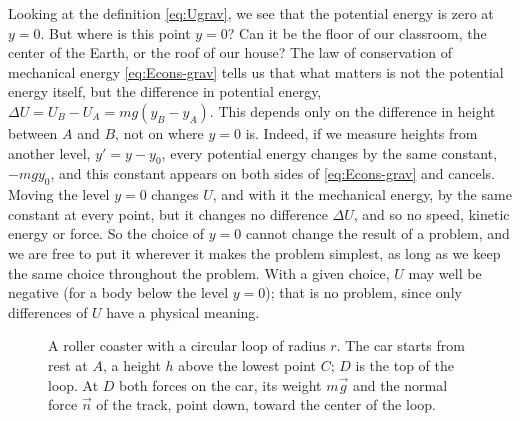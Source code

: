 \documentclass[11pt,a4paper]{article}
\begin{document}
Looking at the definition \eqref{eq:Ugrav}, we see that the potential energy is zero at $y = 0$.
But where is this point $y = 0$? Can it be the floor of our classroom, the center of the Earth, or
the roof of our house? The law of conservation of mechanical energy \eqref{eq:Econs-grav} tells us
that what matters is not the potential energy itself, but the difference in potential energy,
$\Delta U = U_B - U_A = mg(y_B - y_A)$. This depends only on the difference in height between $A$
and $B$, not on where $y = 0$ is. Indeed, if we measure heights from another level, $y' = y - y_0$,
every potential energy changes by the same constant, $-mgy_0$, and this constant appears on both
sides of \eqref{eq:Econs-grav} and cancels. Moving the level $y = 0$ changes $U$, and with it the
mechanical energy, by the same constant at every point, but it changes no difference $\Delta U$, and
so no speed, kinetic energy or force. So the choice of $y = 0$ cannot change the result of a
problem, and we are free to put it wherever it makes the problem simplest, as long as we keep the
same choice throughout the problem. With a given choice,
$U$ may well be negative (for a body below the level $y = 0$); that is no problem, since only
differences of $U$ have a physical meaning.

\begin{figure}[ht]
\centering
{}
\caption{A roller coaster with a circular loop of radius $r$. The car starts from rest at $A$, a
height $h$ above the lowest point $C$; $D$ is the top of the loop. At $D$ both forces on the car,
its weight $m\vec{g}$ and the normal force $\vec{n}$ of the track, point down, toward the center of
the loop.}\label{fig:coaster}
\end{figure}
\end{document}

